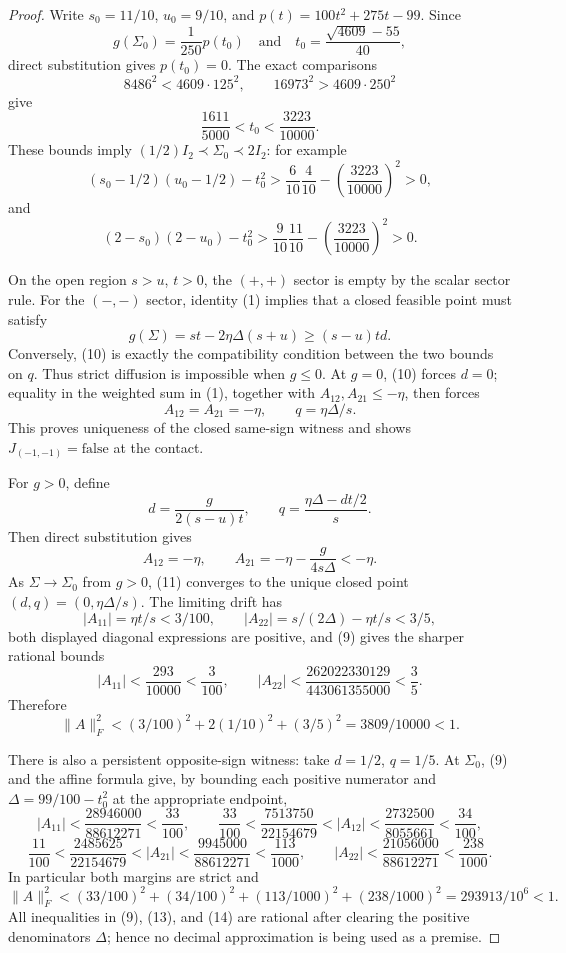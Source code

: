 \documentclass{article}
\begin{document}
\begin{proof}
Write \(s_0=11/10\), \(u_0=9/10\), and \(p(t)=100t^2+275t-99\).  Since
\[
 g(\Sigma_0)=\frac1{250}p(t_0)
 \quad\text{and}\quad
 t_0=\frac{\sqrt{4609}-55}{40},
\]
direct substitution gives \(p(t_0)=0\).  The exact comparisons
\[
 8486^2<4609\cdot125^2,\qquad
 16973^2>4609\cdot250^2
\]
give
\[
 \frac{1611}{5000}<t_0<\frac{3223}{10000}. \tag{9}
\]
These bounds imply \((1/2)I_2\prec\Sigma_0\prec2I_2\): for example
\[
 (s_0-1/2)(u_0-1/2)-t_0^2>\frac6{10}\frac4{10}-\left(\frac{3223}{10000}\right)^2>0,
\]
and
\[
 (2-s_0)(2-u_0)-t_0^2>\frac9{10}\frac{11}{10}-\left(\frac{3223}{10000}\right)^2>0.
\]

On the open region \(s>u\), \(t>0\), the \((+,+)\) sector is empty by the scalar sector rule.  For the \((-,-)\) sector, identity (1) implies that a closed feasible point must satisfy
\[
 g(\Sigma)=st-2\eta\Delta(s+u)\ge(s-u)td. \tag{10}
\]
Conversely, (10) is exactly the compatibility condition between the two bounds on \(q\).  Thus strict diffusion is impossible when \(g\le0\).  At \(g=0\), (10) forces \(d=0\); equality in the weighted sum in (1), together with \(A_{12},A_{21}\le-\eta\), then forces
\[
 A_{12}=A_{21}=-\eta,\qquad q=\eta\Delta/s.
\]
This proves uniqueness of the closed same-sign witness and shows \(J_{(-1,-1)}=\mathrm{false}\) at the contact.

For \(g>0\), define
\[
 d=\frac{g}{2(s-u)t},\qquad
 q=\frac{\eta\Delta-dt/2}{s}. \tag{11}
\]
Then direct substitution gives
\[
 A_{12}=-\eta,\qquad
 A_{21}=-\eta-\frac{g}{4s\Delta}< -\eta. \tag{12}
\]
As \(\Sigma\to\Sigma_0\) from \(g>0\), (11) converges to the unique closed point \((d,q)=(0,\eta\Delta/s)\).  The limiting drift has
\[
 |A_{11}|=\eta t/s<3/100,\qquad
 |A_{22}|=s/(2\Delta)-\eta t/s<3/5,
\]
both displayed diagonal expressions are positive, and (9) gives the sharper rational bounds
\[
 |A_{11}|<\frac{293}{10000}<\frac3{100},\qquad
 |A_{22}|<\frac{262022330129}{443061355000}<\frac35.
\]
Therefore
\[
 \lVert A\rVert_F^2<(3/100)^2+2(1/10)^2+(3/5)^2
 =3809/10000<1. \tag{13}
\]

There is also a persistent opposite-sign witness: take \(d=1/2\), \(q=1/5\).  At \(\Sigma_0\), (9) and the affine formula give, by bounding each positive numerator and \(\Delta=99/100-t_0^2\) at the appropriate endpoint,
\[
 |A_{11}|<\frac{28946000}{88612271}<\frac{33}{100},
 \qquad
 \frac{33}{100}<\frac{7513750}{22154679}<|A_{12}|<
 \frac{2732500}{8055661}<\frac{34}{100},
\]
\[
 \frac{11}{100}<\frac{2485625}{22154679}<|A_{21}|<
 \frac{9945000}{88612271}<\frac{113}{1000},
 \qquad
 |A_{22}|<\frac{21056000}{88612271}<\frac{238}{1000}.
\]
In particular both margins are strict and
\[
 \lVert A\rVert_F^2
 <(33/100)^2+(34/100)^2+(113/1000)^2+(238/1000)^2
 =293913/10^6<1. \tag{14}
\]
All inequalities in (9), (13), and (14) are rational after clearing the positive denominators \(\Delta\); hence no decimal approximation is being used as a premise.


\end{proof}
\end{document}
